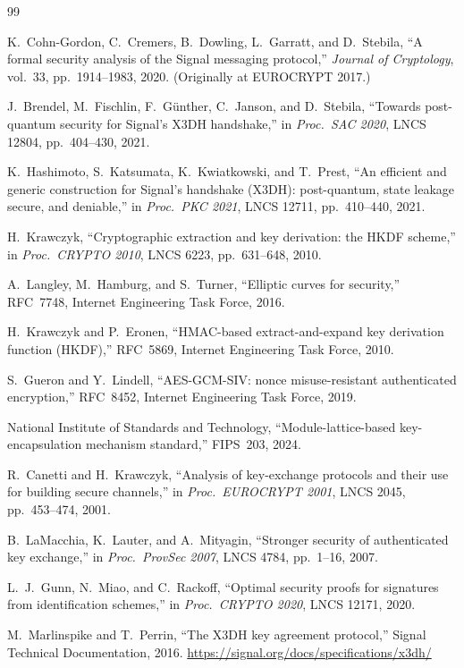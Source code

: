 \documentclass[11pt,a4paper]{article}
\theoremstyle{definition}
\theoremstyle{remark}
\begin{document}
\begin{thebibliography}{99}

K.~Cohn-Gordon, C.~Cremers, B.~Dowling, L.~Garratt, and D.~Stebila,
``A formal security analysis of the Signal messaging protocol,''
\emph{Journal of Cryptology}, vol.~33, pp.~1914--1983, 2020.
(Originally at EUROCRYPT 2017.)

J.~Brendel, M.~Fischlin, F.~G\"{u}nther, C.~Janson, and D.~Stebila,
``Towards post-quantum security for Signal's X3DH handshake,''
in \emph{Proc.\ SAC 2020}, LNCS 12804, pp.~404--430, 2021.

K.~Hashimoto, S.~Katsumata, K.~Kwiatkowski, and T.~Prest,
``An efficient and generic construction for Signal's handshake (X3DH):
post-quantum, state leakage secure, and deniable,''
in \emph{Proc.\ PKC 2021}, LNCS 12711, pp.~410--440, 2021.

H.~Krawczyk,
``Cryptographic extraction and key derivation: the HKDF scheme,''
in \emph{Proc.\ CRYPTO 2010}, LNCS 6223, pp.~631--648, 2010.

A.~Langley, M.~Hamburg, and S.~Turner,
``Elliptic curves for security,''
RFC~7748, Internet Engineering Task Force, 2016.

H.~Krawczyk and P.~Eronen,
``HMAC-based extract-and-expand key derivation function (HKDF),''
RFC~5869, Internet Engineering Task Force, 2010.

S.~Gueron and Y.~Lindell,
``AES-GCM-SIV: nonce misuse-resistant authenticated encryption,''
RFC~8452, Internet Engineering Task Force, 2019.

National Institute of Standards and Technology,
``Module-lattice-based key-encapsulation mechanism standard,''
FIPS~203, 2024.

R.~Canetti and H.~Krawczyk,
``Analysis of key-exchange protocols and their use for building
secure channels,''
in \emph{Proc.\ EUROCRYPT 2001}, LNCS 2045, pp.~453--474, 2001.

B.~LaMacchia, K.~Lauter, and A.~Mityagin,
``Stronger security of authenticated key exchange,''
in \emph{Proc.\ ProvSec 2007}, LNCS 4784, pp.~1--16, 2007.

L.~J.~Gunn, N.~Miao, and C.~Rackoff,
``Optimal security proofs for signatures from identification schemes,''
in \emph{Proc.\ CRYPTO 2020}, LNCS 12171, 2020.

M.~Marlinspike and T.~Perrin,
``The X3DH key agreement protocol,''
Signal Technical Documentation, 2016.
\url{https://signal.org/docs/specifications/x3dh/}

\end{thebibliography}
\end{document}
